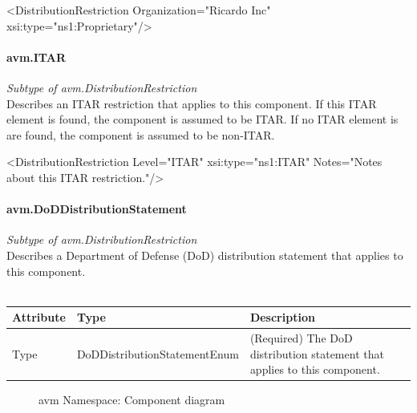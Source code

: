 \begin{MyVerbatim}[frame=single]
  <DistributionRestriction Organization="Ricardo Inc"
     xsi:type="ns1:Proprietary"/>
\end{MyVerbatim}

\paragraph{avm.ITAR}
\textit{Subtype of avm.DistributionRestriction}\\
Describes an ITAR restriction that applies to this component. If this ITAR element is found, the component is assumed to be ITAR. If no ITAR element is are found, the component is assumed to be non-ITAR.

\begin{MyVerbatim}[frame=single]
  <DistributionRestriction Level="ITAR" xsi:type="ns1:ITAR" 
Notes="Notes about this ITAR restriction."/>
\end{MyVerbatim}

\paragraph{avm.DoDDistributionStatement}
\textit{Subtype of avm.DistributionRestriction}\\
Describes a Department of Defense (DoD) distribution statement that applies to this component.
\\ \\
\begin{tabular}{ l l p{9cm} }
\textbf{Attribute} & \textbf{Type} & \textbf{Description} \\ \hline
Type & DoDDistributionStatementEnum & (Required) The DoD distribution statement that applies to this component. \\ \hline
\end{tabular}


\begin{figure}[h!]
\caption{avm Namespace: Component diagram}
\label{Component_diagram}
\end{figure}

